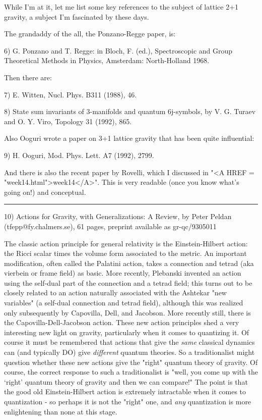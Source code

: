 While I'm at it, let me list some key references to the subject of
lattice 2+1 gravity, a subject I'm fascinated by these days.

The grandaddy of the all, the Ponzano-Regge paper, is:
 
6) G. Ponzano and T. Regge: in Bloch, F. (ed.), Spectroscopic and Group
Theoretical Methods in Physics, Amsterdam: North-Holland 1968.

Then there are:
 
7) E. Witten, Nucl. Phys. B311 (1988), 46.

8) State sum invariants of 3-manifolds and quantum 6j-symbols, by V. G. Turaev
and O. Y. Viro, Topology 31 (1992), 865. 
 
Also Ooguri wrote a paper on 3+1 lattice gravity that has been quite
influential: 
 
9) H. Ooguri, Mod. Phys. Lett. A7 (1992), 2799.

And there is also the recent paper by Rovelli, which I discussed in
"<A HREF = "week14.html">week14</A>".  This is very readable (once you know what's going on!) and
conceptual.

\par\noindent\rule{\textwidth}{0.4pt}

10)  Actions for Gravity, with Generalizations: A Review, by Peter
Peldan (tfepp@fy.chalmers.se), 61 pages, preprint available as gr-qc/9305011

The classic action principle for general relativity is the
Einstein-Hilbert action: the Ricci scalar times the volume form
associated to the metric.  An important modification, often called the
Palatini action, takes a connection and tetrad (aka vierbein or frame
field) as basic.  More recently, Plebanski invented an action using the
self-dual part of the connection and a tetrad field; this turns out to
be closely related to an action naturally associated with the Ashtekar
"new variables" (a self-dual connection and tetrad field), although this
was realized only subsequently by Capovilla, Dell, and Jacobson.  More
recently still, there is the Capovilla-Dell-Jacobson action.  These new
action principles shed a very interesting new light on gravity, particularly
when it comes to quantizing it.  Of course it must be remembered that
actions that give the \emph{same} classical dynamics can (and typically DO)
give \emph{different} quantum theories.  So a traditionalist might question
whether these new actions give the "right" quantum theory of gravity.
Of course, the correct response to such a traditionalist is "well, you
come up with the `right' quantum theory of gravity and then we can
compare!"  The point is that the good old Einstein-Hilbert action is
extremely intractable when it comes to quantization - so perhaps it is
not the "right" one, and \emph{any} quantization is more enlightening than
none at this stage.  


